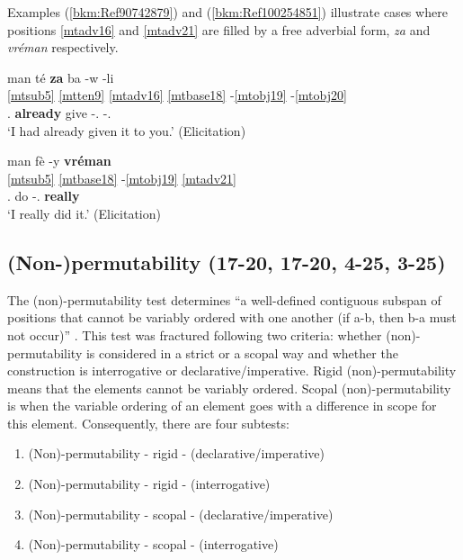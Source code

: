 \documentclass[output=paper]{langscibook}
\begin{document}
Examples (\ref{bkm:Ref90742879}) and (\ref{bkm:Ref100254851}) illustrate cases where positions \ref{mtadv16} and \ref{mtadv21} are filled by a free adverbial form, \textit{za} and \textit{vréman} respectively. 


\ea\label{bkm:Ref90742879}
\glll man té \textbf{za} ba -w -li\\
\ref{mtsub5} \ref{mtten9} \ref{mtadv16} \ref{mtbase18} -\ref{mtobj19} -\ref{mtobj20} \\ 
\First\Sg.\Sarg{} \Pst{} \textbf{already} give -\Second\Sg.\Obj{} -\Third\Sg.\Obj{}\\
\glt `I had already given it to you.' (Elicitation)
\z


\ea\label{bkm:Ref100254851}
\glll man fè -y \textbf{vréman}\\
\ref{mtsub5} \ref{mtbase18} -\ref{mtobj19} \ref{mtadv21} \\ 
\First\Sg.\Sarg{} do -\Third\Sg.\Obj{} \textbf{really}\\
\glt `I really did it.' (Elicitation)
\z

\subsection{(Non-)permutability (17-20, 17-20, 4-25, 3-25)}

The (non)-permutability test determines “a well-defined contiguous subspan of positions that cannot be variably ordered with one another (if a-b, then b-a must not occur)'' \citep[16]{tallman2021constituency}. This test was fractured following two criteria: whether (non)-permutability is considered in a strict or a scopal way and whether the construction is interrogative or declarative/imperative. Rigid (non)-permutability means that the elements cannot be variably ordered. Scopal (non)-permutability is when the variable ordering of an element goes with a difference in scope for this element. Consequently, there are four subtests:

\begin{enumerate}
\item 
(Non)-permutability - rigid - (declarative/imperative)
\item 
(Non)-permutability - rigid - (interrogative)
\item 
(Non)-permutability - scopal - (declarative/imperative)
\item 
(Non)-permutability - scopal - (interrogative)
\end{enumerate}
\end{document}

